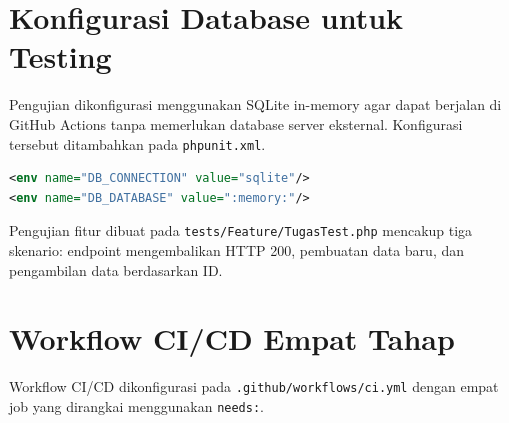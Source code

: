 \documentclass[a4paper,oneside,11pt]{book}
\begin{document}
\section{Konfigurasi Database untuk Testing}

Pengujian dikonfigurasi menggunakan SQLite in-memory agar dapat berjalan di GitHub Actions tanpa memerlukan database server eksternal. Konfigurasi tersebut ditambahkan pada \texttt{phpunit.xml}.

\begin{lstlisting}[language=xml, caption={Konfigurasi SQLite in-memory di phpunit.xml}]
<env name="DB_CONNECTION" value="sqlite"/>
<env name="DB_DATABASE" value=":memory:"/>
\end{lstlisting}

Pengujian fitur dibuat pada \texttt{tests/Feature/TugasTest.php} mencakup tiga skenario: endpoint mengembalikan HTTP 200, pembuatan data baru, dan pengambilan data berdasarkan ID.


\section{Workflow CI/CD Empat Tahap}

Workflow CI/CD dikonfigurasi pada \texttt{.github/workflows/ci.yml} dengan empat job yang dirangkai menggunakan \texttt{needs:}.
\end{document}
